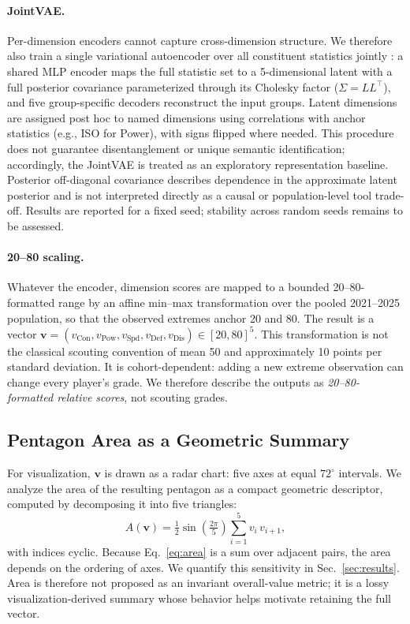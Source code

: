 \documentclass[10pt,twocolumn,letterpaper]{article}
\begin{document}
\paragraph{JointVAE.}
Per-dimension encoders cannot capture cross-dimension structure. We therefore also train a single variational autoencoder over all constituent statistics jointly \cite{kingma2014}: a shared MLP encoder maps the full statistic set to a 5-dimensional latent with a full posterior covariance parameterized through its Cholesky factor ($\Sigma = LL^{\top}$), and five group-specific decoders reconstruct the input groups. Latent dimensions are assigned post hoc to named dimensions using correlations with anchor statistics (e.g., ISO for Power), with signs flipped where needed. This procedure does not guarantee disentanglement or unique semantic identification; accordingly, the JointVAE is treated as an exploratory representation baseline. Posterior off-diagonal covariance describes dependence in the approximate latent posterior and is not interpreted directly as a causal or population-level tool trade-off. Results are reported for a fixed seed; stability across random seeds remains to be assessed.

\paragraph{20--80 scaling.}
Whatever the encoder, dimension scores are mapped to a bounded 20--80-formatted range by an affine min--max transformation over the pooled 2021--2025 population, so that the observed extremes anchor 20 and 80. The result is a vector $\mathbf{v} = (v_{\text{Con}}, v_{\text{Pow}}, v_{\text{Spd}}, v_{\text{Def}}, v_{\text{Dis}}) \in [20,80]^5$. This transformation is not the classical scouting convention of mean 50 and approximately 10 points per standard deviation. It is cohort-dependent: adding a new extreme observation can change every player's grade. We therefore describe the outputs as \emph{20--80-formatted relative scores}, not scouting grades.

\subsection{Pentagon Area as a Geometric Summary}
For visualization, $\mathbf{v}$ is drawn as a radar chart: five axes at equal $72^\circ$ intervals. We analyze the area of the resulting pentagon as a compact geometric descriptor, computed by decomposing it into five triangles:
\begin{equation}
A(\mathbf{v}) = \tfrac{1}{2}\sin\!\left(\tfrac{2\pi}{5}\right) \sum_{i=1}^{5} v_i\, v_{i+1},
\label{eq:area}
\end{equation}
with indices cyclic. Because Eq.~\ref{eq:area} is a sum over adjacent pairs, the area depends on the ordering of axes. We quantify this sensitivity in Sec.~\ref{sec:results}. Area is therefore not proposed as an invariant overall-value metric; it is a lossy visualization-derived summary whose behavior helps motivate retaining the full vector.
\end{document}
